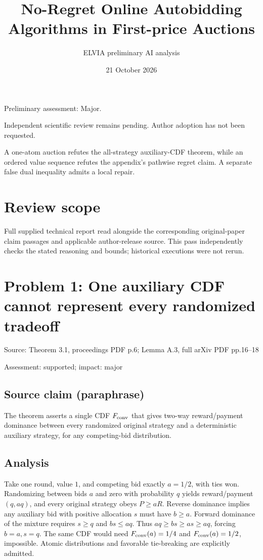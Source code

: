 \documentclass[11pt]{article}
\begin{document}
\title{No-Regret Online Autobidding Algorithms in First-price Auctions}

\author{ELVIA preliminary AI analysis}\date{21 October 2026}\maketitle

Preliminary assessment: Major.\par

Independent scientific review remains pending. Author adoption has not been requested.

A one-atom auction refutes the all-strategy auxiliary-CDF theorem, while an ordered value sequence refutes the appendix’s pathwise regret claim. A separate false dual inequality admits a local repair.

\section*{Review scope}

Full supplied technical report read alongside the corresponding original-paper claim passages and applicable author-release source. This pass independently checks the stated reasoning and bounds; historical executions were not rerun.

\section*{Problem 1: One auxiliary CDF cannot represent every randomized tradeoff}

Source: Theorem 3.1, proceedings PDF p.6; Lemma A.3, full arXiv PDF pp.16–18

Assessment: supported; impact: major

\subsection*{Source claim (paraphrase)}

The theorem asserts a single CDF \(F_{\rm conv}\) that gives two-way reward/payment dominance between every randomized original strategy and a deterministic auxiliary strategy, for any competing-bid distribution.

\subsection*{Analysis}

Take one round, value \(1\), and competing bid exactly \(a=1/2\), with ties won. Randomizing between bids \(a\) and zero with probability \(q\) yields reward/payment \((q,aq)\), and every original strategy obeys \(P\geq aR\). Reverse dominance implies any auxiliary bid with positive allocation \(s\) must have \(b\geq a\). Forward dominance of the mixture requires \(s\geq q\) and \(bs\leq aq\). Thus \(aq\geq bs\geq as\geq aq\), forcing \(b=a,s=q\). The same CDF would need \(F_{\rm conv}(a)=1/4\) and \(F_{\rm conv}(a)=1/2\), impossible. Atomic distributions and favorable tie-breaking are explicitly admitted.
\end{document}
